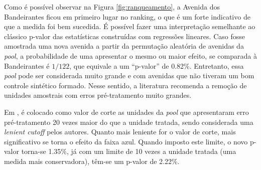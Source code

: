 Como é possível observar na Figura \ref{fig:ranqueamento}, a Avenida dos Bandeirantes ficou em primeiro lugar no ranking, o que é um forte indicativo de que a medida foi bem sucedida. É possível fazer uma interpretação semelhante ao clássico p-valor das estatísticas construídas com regressões lineares. Caso fosse amostrada uma nova avenida a partir da permutação aleatória de avenidas da \textit{pool}, a probabilidade de uma apresentar o mesmo ou maior efeito, se comparada à Bandeirantes é $1/122$, que equivale a um ``p-valor'' de 0.82\%. Entretanto, essa \textit{pool} pode ser considerada muito grande e com avenidas que não tiveram um bom controle sintético formado. Nesse sentido, a literatura recomenda a remoção de unidades amostrais com erros pré-tratamento muito grandes.

Em \textcite{abadie2010synthetic}, é colocado como valor de corte as unidades da \textit{pool} que apresentaram erro pré-tratamento 20 vezes maior do que a unidade tratada, sendo considerada uma \textit{lenient cutoff} pelos autores. Quanto mais leniente for o valor de corte, mais significativo se torna o efeito da faixa azul. Quando imposto este limite, o novo p-valor torna-se 1.35\%, já com um limite de 10 vezes a unidade tratada (uma medida mais conservadora), têm-se um p-valor de 2.22\%.




